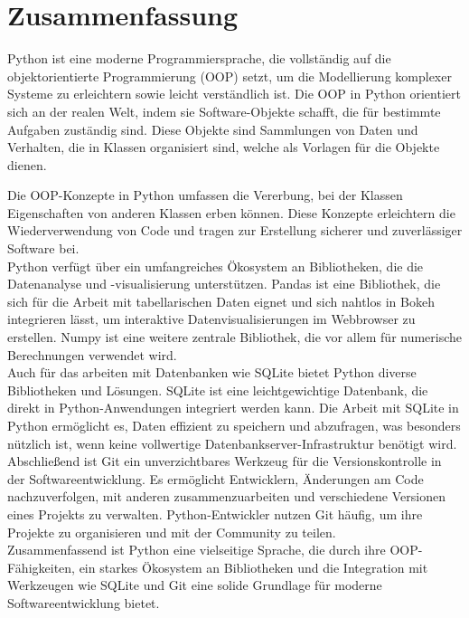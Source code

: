 \chapter{Zusammenfassung}


Python ist eine moderne Programmiersprache, die vollständig auf die objektorientierte Programmierung (OOP) setzt, um die Modellierung komplexer Systeme zu erleichtern sowie leicht verständlich ist. Die OOP in Python orientiert sich an der realen Welt, indem sie Software-Objekte schafft, die für bestimmte Aufgaben zuständig sind. Diese Objekte sind Sammlungen von Daten und Verhalten, die in Klassen organisiert sind, welche als Vorlagen für die Objekte dienen. 

Die OOP-Konzepte in Python umfassen die Vererbung, bei der Klassen Eigenschaften von anderen Klassen erben können. Diese Konzepte erleichtern die Wiederverwendung von Code und tragen zur Erstellung sicherer und zuverlässiger Software bei.\\


Python verfügt über ein umfangreiches Ökosystem an Bibliotheken, die die Datenanalyse und -visualisierung unterstützen. Pandas ist eine Bibliothek, die sich für die Arbeit mit tabellarischen Daten eignet und sich nahtlos in Bokeh integrieren lässt, um interaktive Datenvisualisierungen im Webbrowser zu erstellen. Numpy ist eine weitere zentrale Bibliothek, die vor allem für numerische Berechnungen verwendet wird. \\

Auch für das arbeiten mit Datenbanken wie SQLite bietet Python diverse Bibliotheken und Lösungen. SQLite ist eine leichtgewichtige Datenbank, die direkt in Python-Anwendungen integriert werden kann. Die Arbeit mit SQLite in Python ermöglicht es, Daten effizient zu speichern und abzufragen, was besonders nützlich ist, wenn keine vollwertige Datenbankserver-Infrastruktur benötigt wird.\\

Abschließend ist Git ein unverzichtbares Werkzeug für die Versionskontrolle in der Softwareentwicklung. Es ermöglicht Entwicklern, Änderungen am Code nachzuverfolgen, mit anderen zusammenzuarbeiten und verschiedene Versionen eines Projekts zu verwalten. Python-Entwickler nutzen Git häufig, um ihre Projekte zu organisieren und mit der Community zu teilen.\\

Zusammenfassend ist Python eine vielseitige Sprache, die durch ihre OOP-Fähigkeiten, ein starkes Ökosystem an Bibliotheken und die Integration mit Werkzeugen wie SQLite und Git eine solide Grundlage für moderne Softwareentwicklung bietet.
